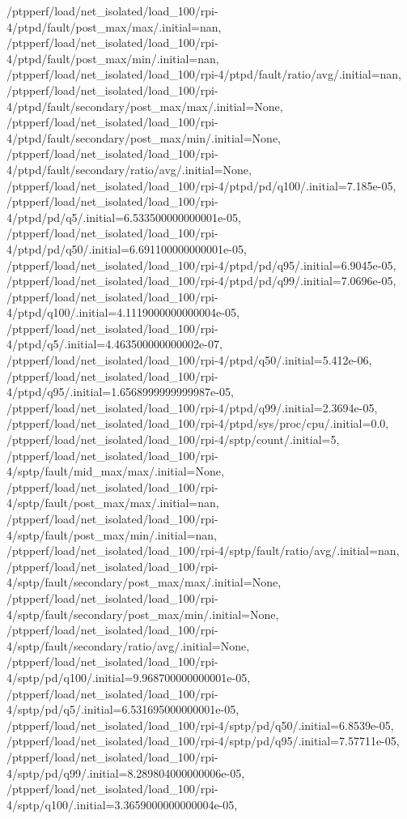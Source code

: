 {    /ptpperf/load/net_isolated/load_100/rpi-4/ptpd/fault/post_max/max/.initial=nan,
    /ptpperf/load/net_isolated/load_100/rpi-4/ptpd/fault/post_max/min/.initial=nan,
    /ptpperf/load/net_isolated/load_100/rpi-4/ptpd/fault/ratio/avg/.initial=nan,
    /ptpperf/load/net_isolated/load_100/rpi-4/ptpd/fault/secondary/post_max/max/.initial=None,
    /ptpperf/load/net_isolated/load_100/rpi-4/ptpd/fault/secondary/post_max/min/.initial=None,
    /ptpperf/load/net_isolated/load_100/rpi-4/ptpd/fault/secondary/ratio/avg/.initial=None,
    /ptpperf/load/net_isolated/load_100/rpi-4/ptpd/pd/q100/.initial=7.185e-05,
    /ptpperf/load/net_isolated/load_100/rpi-4/ptpd/pd/q5/.initial=6.533500000000001e-05,
    /ptpperf/load/net_isolated/load_100/rpi-4/ptpd/pd/q50/.initial=6.691100000000001e-05,
    /ptpperf/load/net_isolated/load_100/rpi-4/ptpd/pd/q95/.initial=6.9045e-05,
    /ptpperf/load/net_isolated/load_100/rpi-4/ptpd/pd/q99/.initial=7.0696e-05,
    /ptpperf/load/net_isolated/load_100/rpi-4/ptpd/q100/.initial=4.1119000000000004e-05,
    /ptpperf/load/net_isolated/load_100/rpi-4/ptpd/q5/.initial=4.463500000000002e-07,
    /ptpperf/load/net_isolated/load_100/rpi-4/ptpd/q50/.initial=5.412e-06,
    /ptpperf/load/net_isolated/load_100/rpi-4/ptpd/q95/.initial=1.6568999999999987e-05,
    /ptpperf/load/net_isolated/load_100/rpi-4/ptpd/q99/.initial=2.3694e-05,
    /ptpperf/load/net_isolated/load_100/rpi-4/ptpd/sys/proc/cpu/.initial=0.0,
    /ptpperf/load/net_isolated/load_100/rpi-4/sptp/count/.initial=5,
    /ptpperf/load/net_isolated/load_100/rpi-4/sptp/fault/mid_max/max/.initial=None,
    /ptpperf/load/net_isolated/load_100/rpi-4/sptp/fault/post_max/max/.initial=nan,
    /ptpperf/load/net_isolated/load_100/rpi-4/sptp/fault/post_max/min/.initial=nan,
    /ptpperf/load/net_isolated/load_100/rpi-4/sptp/fault/ratio/avg/.initial=nan,
    /ptpperf/load/net_isolated/load_100/rpi-4/sptp/fault/secondary/post_max/max/.initial=None,
    /ptpperf/load/net_isolated/load_100/rpi-4/sptp/fault/secondary/post_max/min/.initial=None,
    /ptpperf/load/net_isolated/load_100/rpi-4/sptp/fault/secondary/ratio/avg/.initial=None,
    /ptpperf/load/net_isolated/load_100/rpi-4/sptp/pd/q100/.initial=9.968700000000001e-05,
    /ptpperf/load/net_isolated/load_100/rpi-4/sptp/pd/q5/.initial=6.531695000000001e-05,
    /ptpperf/load/net_isolated/load_100/rpi-4/sptp/pd/q50/.initial=6.8539e-05,
    /ptpperf/load/net_isolated/load_100/rpi-4/sptp/pd/q95/.initial=7.57711e-05,
    /ptpperf/load/net_isolated/load_100/rpi-4/sptp/pd/q99/.initial=8.289804000000006e-05,
    /ptpperf/load/net_isolated/load_100/rpi-4/sptp/q100/.initial=3.3659000000000004e-05,
}

